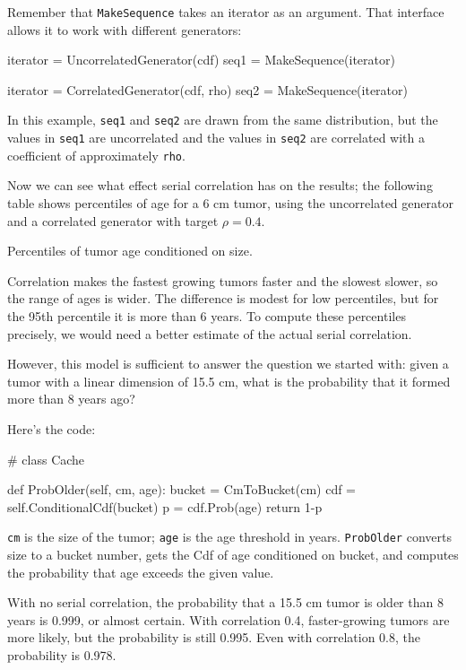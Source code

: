 \documentclass[12pt]{book}
\theoremstyle{exercise}
\newcommand{\py}[1]{{\tt #1}}%
\begin{document}
Remember that \py{MakeSequence} takes an iterator as an argument.
That interface allows it to work with different generators:

\begin{code}
    iterator = UncorrelatedGenerator(cdf)
    seq1 = MakeSequence(iterator)

    iterator = CorrelatedGenerator(cdf, rho)
    seq2 = MakeSequence(iterator)
\end{code}

In this example, \py{seq1} and \py{seq2} are
drawn from the same distribution, but the values in \py{seq1}
are uncorrelated and the values in \py{seq2} are correlated
with a coefficient of approximately \py{rho}.

Now we can see what effect serial correlation has on the results;
the following table shows percentiles of age for a 6 cm tumor,
using the uncorrelated generator and a correlated generator
with target $\rho = 0.4$.

\begin{table}

\caption{Percentiles of tumor age conditioned on size.}
\end{table}

Correlation makes the fastest growing tumors faster and the slowest
slower, so the range of ages is wider.  The difference is modest for
low percentiles, but for the 95th percentile it is more than 6 years.
To compute these percentiles precisely, we would need a better
estimate of the actual serial correlation.

However, this model is sufficient to answer the question
we started with: given a tumor with a linear dimension of
15.5 cm, what is the probability that it formed more than
8 years ago?

Here's the code:

\begin{code}
# class Cache

    def ProbOlder(self, cm, age):
        bucket = CmToBucket(cm)
        cdf = self.ConditionalCdf(bucket)
        p = cdf.Prob(age)
        return 1-p
\end{code}

\py{cm} is the size of the tumor; \py{age} is the age threshold
in years.  \py{ProbOlder} converts size to a bucket number,
gets the Cdf of age conditioned on bucket, and computes the
probability that age exceeds the given value.

With no serial correlation, the probability that a
15.5 cm tumor is older than 8 years is 0.999, or almost certain.
With correlation 0.4, faster-growing tumors are more likely, but
the probability is still 0.995.  Even with correlation 0.8, the
probability is 0.978.
\end{document}
